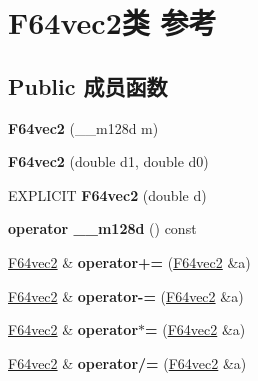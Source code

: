 \hypertarget{class_f64vec2}{}\section{F64vec2类 参考}
\label{class_f64vec2}
\subsection*{Public 成员函数}
\begin{DoxyCompactItemize}
\item 
\mbox{\label{class_f64vec2_affe6bc7f7f50c65972defb0122ec4f06}} 
{\bfseries F64vec2} (\+\_\+\+\_\+m128d m)
\item 
\mbox{\label{class_f64vec2_adf5cfe1e433319cd4bbca859e3dba388}} 
{\bfseries F64vec2} (double d1, double d0)
\item 
\mbox{\label{class_f64vec2_a1ffc6844b747497d1c15af9b8495f292}} 
E\+X\+P\+L\+I\+C\+IT {\bfseries F64vec2} (double d)
\item 
\mbox{\label{class_f64vec2_a4a00dcc78c8efd511706e2f10e81f9c0}} 
{\bfseries operator \+\_\+\+\_\+m128d} () const
\item 
\mbox{\label{class_f64vec2_aa94d9f2e833f958a72769117321e562b}} 
\hyperlink{class_f64vec2}{F64vec2} \& {\bfseries operator+=} (\hyperlink{class_f64vec2}{F64vec2} \&a)
\item 
\mbox{\label{class_f64vec2_aadfc55d7e80430a565e7bf02ede835ec}} 
\hyperlink{class_f64vec2}{F64vec2} \& {\bfseries operator-\/=} (\hyperlink{class_f64vec2}{F64vec2} \&a)
\item 
\mbox{\label{class_f64vec2_ad55fc0b026f5e9da65a8f95ed05497b4}} 
\hyperlink{class_f64vec2}{F64vec2} \& {\bfseries operator$\ast$=} (\hyperlink{class_f64vec2}{F64vec2} \&a)
\item 
\mbox{\label{class_f64vec2_ae5db94522b8b735d952e5029a617088f}} 
\hyperlink{class_f64vec2}{F64vec2} \& {\bfseries operator/=} (\hyperlink{class_f64vec2}{F64vec2} \&a)
\item 
\mbox{\label{class_f64vec2_ad399f48dd364f84ac55eae5e31c4bc6b}} 

\end{DoxyCompactItemize}
